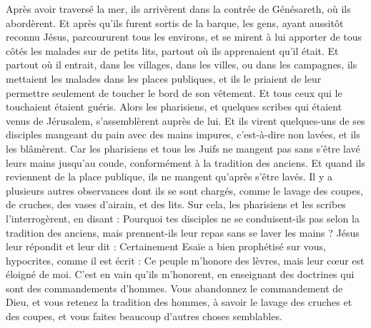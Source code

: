 \begin{multicols}{2}
Après avoir traversé la mer, ils arrivèrent dans la contrée de Génésareth, où ils abordèrent.
Et après qu'ils furent sortis de la barque, les gens, ayant aussitôt reconnu Jésus,
parcoururent tous les environs, et se mirent à lui apporter de tous côtés les malades sur de petits lits, partout où ils apprenaient qu'il était.
Et partout où il entrait, dans les villages, dans les villes, ou dans les campagnes, ils mettaient les malades dans les places publiques, et ils le priaient de leur permettre seulement de toucher le bord de son vêtement. Et tous ceux qui le touchaient étaient guéris.
\VerseOne{}Alors les pharisiens, et quelques scribes qui étaient venus de Jérusalem, s'assemblèrent auprès de lui.
Et ils virent quelques-uns de ses disciples mangeant du pain avec des mains impures, c'est-à-dire non lavées, et ils les blâmèrent.
Car les pharisiens et tous les Juifs ne mangent pas sans s'être lavé leurs mains jusqu'au coude, conformément à la tradition des anciens.
Et quand ils reviennent de la place publique, ils ne mangent qu'après s'être lavés. Il y a plusieurs autres observances dont ils se sont chargés, comme le lavage des coupes, de cruches, des vases d'airain, et des lits.
Sur cela, les pharisiens et les scribes l'interrogèrent, en disant : Pourquoi tes disciples ne se conduisent-ils pas selon la tradition des anciens, mais prennent-ils leur repas sans se laver les mains ?
Jésus leur répondit et leur dit : Certainement Esaïe a bien prophétisé sur vous, hypocrites, comme il est écrit : Ce peuple m'honore des lèvres, mais leur cœur est éloigné de moi.
C'est en vain qu'ils m'honorent, en enseignant des doctrines qui sont des commandements d'hommes.
Vous abandonnez le commandement de Dieu, et vous retenez la tradition des hommes, à savoir le lavage des cruches et des coupes, et vous faites beaucoup d'autres choses semblables.

\end{multicols}

